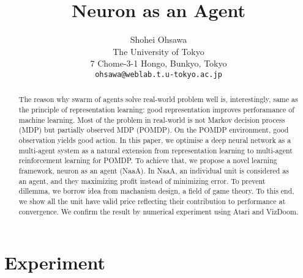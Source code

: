 \documentclass{article} %
\title{Neuron as an Agent}
\author{Shohei Ohsawa \\
The University of Tokyo\\
7 Chome-3-1 Hongo, Bunkyo, Tokyo \\
\texttt{ohsawa@weblab.t.u-tokyo.ac.jp} \\
}
\begin{document}
\maketitle

\begin{abstract}
The reason why swarm of agents solve real-world problem well is, interestingly,
same as the principle of representation learning: good representation improves
perforamance of machine learning. Most of the problem in real-world is not
Markov decision process (MDP) but partially observed MDP (POMDP). On the
POMDP environment, good observation yields good action. In this paper, we
optimise a deep neural network as a multi-agent system as a natural extension
from representation learning to multi-agent reinforcement learning for POMDP.
To achieve that, we propose a novel learning framework, neuron as an agent
(NaaA). In NaaA, an individual unit is considered as an agent, and they maximizing
profit instead of minimizing error. To prevent dillemma, we borrow idea
from machanism design, a field of game theory. To this end, we show all the unit
have valid price reflecting their contribution to performance at convergence. We
confirm the result by numerical experiment using Atari and VizDoom.
\end{abstract}





\section{Experiment}




\end{document}
